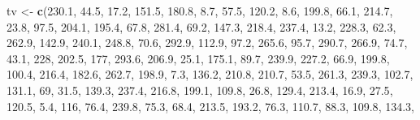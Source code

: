 \documentclass[]{book}
\newenvironment{Shaded}{\begin{snugshade}}{\end{snugshade}}
\newcommand{\KeywordTok}[1]{\textcolor[rgb]{0.13,0.29,0.53}{\textbf{#1}}}
\newcommand{\DecValTok}[1]{\textcolor[rgb]{0.00,0.00,0.81}{#1}}
\newcommand{\FloatTok}[1]{\textcolor[rgb]{0.00,0.00,0.81}{#1}}
\newcommand{\StringTok}[1]{\textcolor[rgb]{0.31,0.60,0.02}{#1}}
\newcommand{\NormalTok}[1]{#1}
\begin{document}
\begin{Shaded}
\begin{Highlighting}[]
\NormalTok{tv <-}\StringTok{ }\KeywordTok{c}\NormalTok{(}\FloatTok{230.1}\NormalTok{, }\FloatTok{44.5}\NormalTok{, }\FloatTok{17.2}\NormalTok{, }\FloatTok{151.5}\NormalTok{, }\FloatTok{180.8}\NormalTok{, }\FloatTok{8.7}\NormalTok{, }\FloatTok{57.5}\NormalTok{, }\FloatTok{120.2}\NormalTok{, }\FloatTok{8.6}\NormalTok{, }\FloatTok{199.8}\NormalTok{, }\FloatTok{66.1}\NormalTok{, }
    \FloatTok{214.7}\NormalTok{, }\FloatTok{23.8}\NormalTok{, }\FloatTok{97.5}\NormalTok{, }\FloatTok{204.1}\NormalTok{, }\FloatTok{195.4}\NormalTok{, }\FloatTok{67.8}\NormalTok{, }\FloatTok{281.4}\NormalTok{, }\FloatTok{69.2}\NormalTok{, }\FloatTok{147.3}\NormalTok{, }\FloatTok{218.4}\NormalTok{, }\FloatTok{237.4}\NormalTok{, }
    \FloatTok{13.2}\NormalTok{, }\FloatTok{228.3}\NormalTok{, }\FloatTok{62.3}\NormalTok{, }\FloatTok{262.9}\NormalTok{, }\FloatTok{142.9}\NormalTok{, }\FloatTok{240.1}\NormalTok{, }\FloatTok{248.8}\NormalTok{, }\FloatTok{70.6}\NormalTok{, }\FloatTok{292.9}\NormalTok{, }\FloatTok{112.9}\NormalTok{, }\FloatTok{97.2}\NormalTok{, }
    \FloatTok{265.6}\NormalTok{, }\FloatTok{95.7}\NormalTok{, }\FloatTok{290.7}\NormalTok{, }\FloatTok{266.9}\NormalTok{, }\FloatTok{74.7}\NormalTok{, }\FloatTok{43.1}\NormalTok{, }\DecValTok{228}\NormalTok{, }\FloatTok{202.5}\NormalTok{, }\DecValTok{177}\NormalTok{, }\FloatTok{293.6}\NormalTok{, }\FloatTok{206.9}\NormalTok{, }\FloatTok{25.1}\NormalTok{, }
    \FloatTok{175.1}\NormalTok{, }\FloatTok{89.7}\NormalTok{, }\FloatTok{239.9}\NormalTok{, }\FloatTok{227.2}\NormalTok{, }\FloatTok{66.9}\NormalTok{, }\FloatTok{199.8}\NormalTok{, }\FloatTok{100.4}\NormalTok{, }\FloatTok{216.4}\NormalTok{, }\FloatTok{182.6}\NormalTok{, }\FloatTok{262.7}\NormalTok{, }\FloatTok{198.9}\NormalTok{, }
    \FloatTok{7.3}\NormalTok{, }\FloatTok{136.2}\NormalTok{, }\FloatTok{210.8}\NormalTok{, }\FloatTok{210.7}\NormalTok{, }\FloatTok{53.5}\NormalTok{, }\FloatTok{261.3}\NormalTok{, }\FloatTok{239.3}\NormalTok{, }\FloatTok{102.7}\NormalTok{, }\FloatTok{131.1}\NormalTok{, }\DecValTok{69}\NormalTok{, }\FloatTok{31.5}\NormalTok{, }\FloatTok{139.3}\NormalTok{, }
    \FloatTok{237.4}\NormalTok{, }\FloatTok{216.8}\NormalTok{, }\FloatTok{199.1}\NormalTok{, }\FloatTok{109.8}\NormalTok{, }\FloatTok{26.8}\NormalTok{, }\FloatTok{129.4}\NormalTok{, }\FloatTok{213.4}\NormalTok{, }\FloatTok{16.9}\NormalTok{, }\FloatTok{27.5}\NormalTok{, }\FloatTok{120.5}\NormalTok{, }\FloatTok{5.4}\NormalTok{, }
    \DecValTok{116}\NormalTok{, }\FloatTok{76.4}\NormalTok{, }\FloatTok{239.8}\NormalTok{, }\FloatTok{75.3}\NormalTok{, }\FloatTok{68.4}\NormalTok{, }\FloatTok{213.5}\NormalTok{, }\FloatTok{193.2}\NormalTok{, }\FloatTok{76.3}\NormalTok{, }\FloatTok{110.7}\NormalTok{, }\FloatTok{88.3}\NormalTok{, }\FloatTok{109.8}\NormalTok{, }\FloatTok{134.3}\NormalTok{, }

\end{Highlighting}
\end{Shaded}
\end{document}
